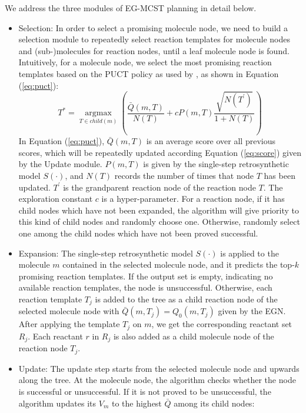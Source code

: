 \documentclass[sn-mathphys,Numbered]{sn-jnl}
\begin{document}
We address the three modules of EG-MCST planning in detail below. 
\begin{itemize}
    \item Selection: In order to select a promising molecule node, we need to build a selection module to repeatedly select reaction templates for molecule nodes and (sub-)molecules for reaction nodes, until a leaf molecule node is found. Intuitively, for a molecule node, we select the most promising reaction templates based on the PUCT policy as used by \cite{puct2010}, as shown in Equation (\ref{eq:puct}):
        \begin{equation}
        T^*=\mathop{\arg\max}\limits_{T\in child(m)}\left( \frac{\bar{Q}(m,T)}{N(T)}+ cP(m,T)\frac{\sqrt{N(T^{\prime})}}{1+N(T)}\right)  
        \label{eq:puct}
        \end{equation}
    In Equation (\ref{eq:puct}), $\bar{Q}(m,T)$ is an average score over all previous scores, which will be repeatedly updated according Equation (\ref{eq:score}) given by the Update module. $P(m,T)$ is given by the single-step retrosynthetic model $S(\cdot)$, and $N(T)$ records the number of times that node $T$ has been updated. $T^{\prime}$ is the grandparent reaction node of the reaction node $T$. The exploration constant $c$ is a  hyper-parameter. For a reaction node, if it has child nodes which have not been expanded, the algorithm will give priority to this kind of child nodes and randomly choose one. Otherwise, randomly select one among the child nodes which have not been proved successful.
    \item Expansion: The single-step retrosynthetic model $S(\cdot)$ is applied to the molecule $m$ contained in the selected molecule node, and it predicts the top-$k$ promising reaction templates. If the output set is empty, indicating no available reaction templates, the node is unsuccessful. Otherwise, each reaction template $T_j$ is added to the tree as a child reaction node of the selected molecule node with $\bar{Q}(m,T_j)=Q_0(m,T_j)$ given by the EGN. After applying the template $T_j$ on $m$, we get the corresponding reactant set $R_j$. Each reactant $r$ in $R_j$ is also added as a child molecule node of the reaction node $T_j$. 
    \item Update: The update step starts from the selected molecule node and upwards along the tree. At the molecule node, the algorithm checks whether the node is successful or unsuccessful. If it is not proved to be unsuccessful, the algorithm updates its $V_m$ to the highest $\bar{Q}$ among its child nodes: 

\end{itemize}
\end{document}

